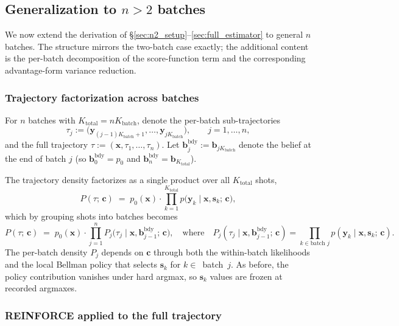 \documentclass[11pt,a4paper]{article}
\newcommand{\bc}{\bm{c}}
\newcommand{\bx}{\bm{x}}
\newcommand{\by}{\bm{y}}
\newcommand{\bs}{\bm{s}}
\newcommand{\bb}{\bm{b}}
\begin{document}
\subsection{Generalization to \texorpdfstring{$n > 2$}{n > 2} batches}
\label{sec:nbatch_general}

We now extend the derivation of \S\ref{sec:n2_setup}--\ref{sec:full_estimator} to general
$n$ batches.  The structure mirrors the two-batch case exactly; the additional content is
the per-batch decomposition of the score-function term and the corresponding advantage-form
variance reduction.

\subsubsection{Trajectory factorization across batches}
\label{sec:nbatch_factorization}

For $n$ batches with $K_\mathrm{total} = n K_\mathrm{batch}$, denote the per-batch
sub-trajectories
\[
\tau_j := \bigl(\by_{(j-1)K_\mathrm{batch} + 1}, \ldots, \by_{j K_\mathrm{batch}}\bigr), \qquad j = 1, \ldots, n,
\]
and the full trajectory $\tau := (\bx, \tau_1, \ldots, \tau_n)$.  Let
$\bb^{\mathrm{bdy}}_j := \bb_{j K_\mathrm{batch}}$ denote the belief at the end of batch
$j$ (so $\bb^{\mathrm{bdy}}_0 = p_0$ and $\bb^{\mathrm{bdy}}_n = \bb_{K_\mathrm{total}}$).

The trajectory density factorizes as a single product over all $K_\mathrm{total}$ shots,
\begin{equation}
P(\tau;\, \bc)
\;=\;
p_0(\bx) \cdot \prod_{k=1}^{K_\mathrm{total}} p\bigl(\by_k \mid \bx, \bs_k;\, \bc\bigr),
\label{eq:Pfactor_full}
\end{equation}
which by grouping shots into batches becomes
\begin{equation}
P(\tau;\, \bc)
\;=\;
p_0(\bx) \cdot \prod_{j=1}^{n} P_j\bigl(\tau_j \mid \bx, \bb^{\mathrm{bdy}}_{j-1};\, \bc\bigr),
\quad \text{where} \quad
P_j(\tau_j \mid \bx, \bb^{\mathrm{bdy}}_{j-1};\, \bc) = \prod_{k \in \text{batch } j} p(\by_k \mid \bx, \bs_k;\, \bc).
\label{eq:Pfactor_perbatch}
\end{equation}
The per-batch density $P_j$ depends on $\bc$ through both the within-batch likelihoods and
the local Bellman policy that selects $\bs_k$ for $k \in$~batch~$j$.  As before, the policy
contribution vanishes under hard argmax, so $\bs_k$ values are frozen at recorded argmaxes.

\subsubsection{REINFORCE applied to the full trajectory}
\label{sec:nbatch_reinforce}
\end{document}
